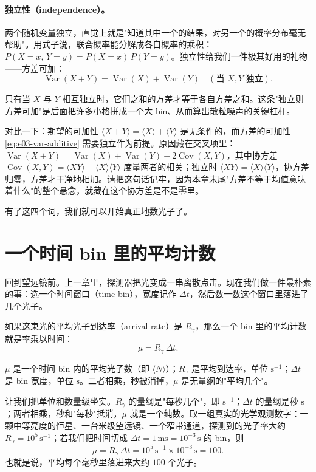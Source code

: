 \paragraph{独立性（independence）。}
两个随机变量独立，直觉上就是"知道其中一个的结果，对另一个的概率分布毫无帮助"。用式子说，联合概率能分解成各自概率的乘积：$P(X=x,\,Y=y)=P(X=x)\,P(Y=y)$。独立性给我们一件极其好用的礼物——方差可加：
\begin{equation}
  \operatorname{Var}(X+Y)=\operatorname{Var}(X)+\operatorname{Var}(Y)
  \quad(\text{当 }X,Y\text{ 独立}).
  \label{eq:e03-var-additive}
\end{equation}
\begin{formulaexplain}
只有当 $X$ 与 $Y$ 相互独立时，它们之和的方差才等于各自方差之和。这条"独立则方差可加"是后面把许多小格拼成一个大 bin、从而算出散粒噪声的关键杠杆。
\end{formulaexplain}
对比一下：期望的可加性 $\langle X+Y\rangle=\langle X\rangle+\langle Y\rangle$ 是无条件的，而方差的可加性 \eqref{eq:e03-var-additive} 需要独立作为前提。原因藏在交叉项里：$\operatorname{Var}(X+Y)=\operatorname{Var}(X)+\operatorname{Var}(Y)+2\operatorname{Cov}(X,Y)$，其中协方差 $\operatorname{Cov}(X,Y)=\langle XY\rangle-\langle X\rangle\langle Y\rangle$ 度量两者的相关；独立时 $\langle XY\rangle=\langle X\rangle\langle Y\rangle$，协方差归零，方差才干净地相加。请把这句话记牢，因为本章末尾"方差不等于均值意味着什么"的整个悬念，就藏在这个协方差是不是零里。

有了这四个词，我们就可以开始真正地数光子了。

\section{一个时间 bin 里的平均计数}
\label{sec:e03-mean}

回到望远镜前。上一章里，探测器把光变成一串离散点击。现在我们做一件最朴素的事：选一个时间窗口（time bin），宽度记作 $\Delta t$，然后数一数这个窗口里落进了几个光子。

如果这束光的平均光子到达率（arrival rate）是 $R_\gamma$，那么一个 bin 里的平均计数就是率乘以时间：
\begin{equation}
  \mu=R_\gamma\,\Delta t .
  \label{eq:e03-mean-count}
\end{equation}
\begin{formulaexplain}
$\mu$ 是一个时间 bin 内的平均光子数（即 $\langle N\rangle$）；$R_\gamma$ 是平均到达率，单位 $\mathrm{s^{-1}}$；$\Delta t$ 是 bin 宽度，单位 $\mathrm{s}$。二者相乘，秒被消掉，$\mu$ 是无量纲的"平均几个"。
\end{formulaexplain}
让我们把单位和数量级坐实。$R_\gamma$ 的量纲是"每秒几个"，即 $\mathrm{s^{-1}}$；$\Delta t$ 的量纲是秒 $\mathrm{s}$；两者相乘，秒和"每秒"抵消，$\mu$ 就是一个纯数。取一组真实的光学观测数字：一颗中等亮度的恒星、一台米级望远镜、一个窄带通道，探测到的光子率大约 $R_\gamma=10^{5}\,\mathrm{s^{-1}}$；若我们把时间切成 $\Delta t=1\,\mathrm{ms}=10^{-3}\,\mathrm{s}$ 的 bin，则
\[
  \mu=R_\gamma\,\Delta t=10^{5}\,\mathrm{s^{-1}}\times10^{-3}\,\mathrm{s}=100 .
\]
也就是说，平均每个毫秒里落进来大约 $100$ 个光子。


